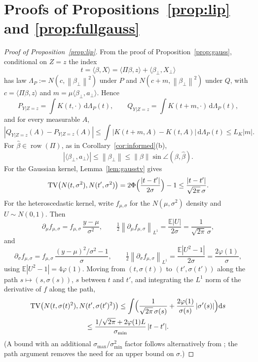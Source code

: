 \documentclass[11pt,a4paper]{article}
\newcommand{\norm}[1]{\left\|#1\right\|}
\newcommand{\E}{\mathbb{E}}
\newcommand{\TV}{\operatorname{TV}}
\theoremstyle{plain}
\theoremstyle{definition}
\theoremstyle{remark}
\begin{document}
\section{Proofs of Propositions~\ref{prop:lip} and \ref{prop:fullgauss}}\label{app:lip}

\begin{proof}[Proof of Proposition~\ref{prop:lip}]
From the proof of Proposition~\ref{prop:gauss}, conditional on $Z=z$ the index
\[
t=\langle\beta,X\rangle=\langle\Pi\beta,z\rangle+\langle\beta_\perp,X_\perp\rangle
\]
has law $\Lambda_P:=N(c,\norm{\beta_\perp}^2)$ under $P$ and $N(c+m,\norm{\beta_\perp}^2)$ under $Q$, with $c=\langle\Pi\beta,z\rangle$ and $m=\mu\langle\beta_\perp,a_\perp\rangle$. Hence
\[
P_{Y|Z=z}=\int K(t,\cdot)\,\mathrm d\Lambda_P(t),\qquad Q_{Y|Z=z}=\int K(t+m,\cdot)\,\mathrm d\Lambda_P(t),
\]
and for every measurable $A$,
\[
|Q_{Y|Z=z}(A)-P_{Y|Z=z}(A)|\le\int|K(t+m,A)-K(t,A)|\,\mathrm d\Lambda_P(t)\le L_K|m| .
\]
For $\hat\beta\in\operatorname{row}(\Pi)$, as in Corollary~\ref{cor:informed}(b),
\[
|\langle\beta_\perp,a_\perp\rangle|\le\norm{\beta_\perp}\le\norm\beta\sin\angle(\beta,\hat\beta).
\]
For the Gaussian kernel, Lemma~\ref{lem:gausstv} gives
\[
\TV\bigl(N(t,\sigma^2),N(t',\sigma^2)\bigr)=2\Phi\Bigl(\frac{|t-t'|}{2\sigma}\Bigr)-1\le\frac{|t-t'|}{\sqrt{2\pi}\,\sigma}.
\]
For the heteroscedastic kernel, write $f_{\mu,\sigma}$ for the $N(\mu,\sigma^2)$ density and $U\sim N(0,1)$. Then
\[
\partial_\mu f_{\mu,\sigma}=f_{\mu,\sigma}\,\frac{y-\mu}{\sigma^2},\qquad
\tfrac12\norm{\partial_\mu f_{\mu,\sigma}}_{L^1}=\frac{\E|U|}{2\sigma}=\frac{1}{\sqrt{2\pi}\,\sigma},
\]
and
\[
\partial_\sigma f_{\mu,\sigma}=f_{\mu,\sigma}\,\frac{(y-\mu)^2/\sigma^2-1}{\sigma},\qquad
\tfrac12\norm{\partial_\sigma f_{\mu,\sigma}}_{L^1}=\frac{\E|U^2-1|}{2\sigma}=\frac{2\varphi(1)}{\sigma},
\]
using $\E|U^2-1|=4\varphi(1)$. Moving from $(t,\sigma(t))$ to $(t',\sigma(t'))$ along the path $s\mapsto(s,\sigma(s))$, $s$ between $t$ and $t'$, and integrating the $L^1$ norm of the derivative of $f$ along the path,
\begin{multline*}
\TV\bigl(N(t,\sigma(t)^2),N(t',\sigma(t')^2)\bigr)\le\int\Bigl(\frac{1}{\sqrt{2\pi}\,\sigma(s)}+\frac{2\varphi(1)}{\sigma(s)}\,|\sigma'(s)|\Bigr)\mathrm ds\\
\le\frac{1/\sqrt{2\pi}+2\varphi(1)L}{\sigma_{\min}}\,|t-t'| .
\end{multline*}
(A bound with an additional $\sigma_{\max}/\sigma_{\min}^2$ factor follows alternatively from \cite[Thm.\ 1.3]{devroye2018}; the path argument removes the need for an upper bound on $\sigma$.)
\end{proof}
\end{document}
